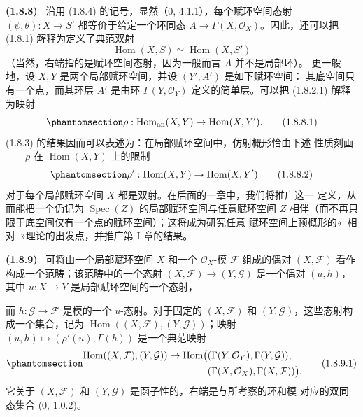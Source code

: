 \documentclass[UTF8,fontset=none,11pt,oneside,openany]{ctexbook}
\providecommand{\sh}{\mathcal}
\providecommand{\Hom}{\operatorname{Hom}}
\providecommand{\Spec}{\operatorname{Spec}}
\providecommand{\isoto}{\simeq}
\newenvironment{env}[1][]{\par\medskip\noindent\textbf{(#1)}\ }{\par}
\newcommand{\oldpage}[2][]{%
  \hypertarget{ega-source-page-#1-#2}{}%
  \marginnote{\scriptsize\textbf{#1}~|~#2}\ignorespaces}
\let\EGAOriginalLabel\label
\renewcommand{\label}[1]{\phantomsection\EGAOriginalLabel{#1}}
\begin{document}
\begin{env}[1.8.8]
\label{ega2:addendum:I.1.8.8-zh}
沿用 (1.8.4) 的记号，显然（0, 4.1.1），每个赋环空间态射
$(\psi,\theta):X\to S'$ 都等价于给定一个环同态
$A\to\Gamma(X,\sh{O}_X)$。因此，还可以把 (1.8.1) 解释为定义了典范双射
\[
  \Hom(X,S)\isoto\Hom(X,S')
\]
（当然，右端指的是赋环空间态射，因为一般而言 $A$ 并不是局部环）。
更一般地，设 $X,Y$ 是两个局部赋环空间，并设 $(Y',A')$ 是如下赋环空间：
其底空间只有一个点，而其环层 $A'$ 是由环
$\Gamma(Y,\sh{O}_Y)$ 定义的简单层。可以把 (1.8.2.1) 解释为映射
\begin{equation}
\label{ega2:addendum:I.1.8.8.1-zh}
  \rho:\Hom_{\mathrm{an}}(X,Y)\to\Hom(X,Y').
\tag{1.8.8.1}
\end{equation}
(1.8.3) 的结果因而可以表述为：在局部赋环空间中，仿射概形恰由下述
性质刻画——$\rho$ 在 $\Hom(X,Y)$ 上的限制
\begin{equation}
\label{ega2:addendum:I.1.8.8.2-zh}
  \rho':\Hom(X,Y)\to\Hom(X,Y')
\tag{1.8.8.2}
\end{equation}
对于每个局部赋环空间 $X$ 都是双射。在后面的一章中，我们将推广这一
定义，从而能把一个仍记为 $\Spec(Z)$ 的局部赋环空间与任意赋环空间
$Z$ 相伴（而不再只限于底空间仅有一个点的赋环空间）；这将成为研究任意
赋环空间上预概形的«~相对~»理论的出发点，并推广第 I 章的结果。
\end{env}

\begin{env}[1.8.9]
\label{ega2:addendum:I.1.8.9-zh}
可将由一个局部赋环空间 $X$ 和一个 $\sh{O}_X$-模 $\sh{F}$ 组成的偶对
$(X,\sh{F})$ 看作构成一个范畴；该范畴中的一个态射
$(X,\sh{F})\to(Y,\sh{G})$ 是一个偶对 $(u,h)$，其中 $u:X\to Y$
是局部赋环空间的一个态射，
\oldpage[II]{221}
而 $h:\sh{G}\to\sh{F}$ 是模的一个 $u$-态射。对于固定的
$(X,\sh{F})$ 和 $(Y,\sh{G})$，这些态射构成一个集合，记为
$\Hom((X,\sh{F}),(Y,\sh{G}))$；映射
$(u,h)\mapsto(\rho'(u),\Gamma(h))$ 是一个典范映射
\begin{equation}
\label{ega2:addendum:I.1.8.9.1-zh}
\begin{split}
  \Hom((X,\sh{F}),(Y,\sh{G}))\to
  \Hom\bigl(
    &(\Gamma(Y,\sh{O}_Y),\Gamma(Y,\sh{G})),\\
    &(\Gamma(X,\sh{O}_X),\Gamma(X,\sh{F}))
  \bigr),
\end{split}
\tag{1.8.9.1}
\end{equation}
它关于 $(X,\sh{F})$ 和 $(Y,\sh{G})$ 是函子性的，右端是与所考察的环和模
对应的双同态集合 (0, 1.0.2)。
\end{env}
\end{document}
